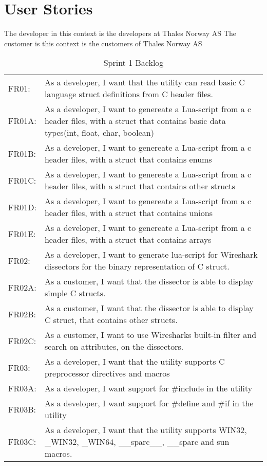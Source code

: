 \section{User Stories}

The developer in this context is the developers at Thales Norway AS \newline
The customer is this context is the customers of Thales Norway AS

\begin{table}[ht] \center
\caption{Sprint 1 Backlog}

\begin{tabular}{l p{12cm} }
FR01: 	&As a developer, I want that the utility can read basic C language struct definitions from C header files.\\
FR01A: 	&As a developer, I want to genereate a Lua-script from a c header files, with a struct that contains basic data types(int, float, char, boolean)\\
FR01B: 	&As a developer, I want to genereate a Lua-script from a c header files, with a struct that contains enums\\
FR01C: 	&As a developer, I want to genereate a Lua-script from a c header files, with a struct that contains other structs\\
FR01D: 	&As a developer, I want to genereate a Lua-script from a c header files, with a struct that contains unions\\
FR01E: 	&As a developer, I want to genereate a Lua-script from a c header files, with a struct that contains arrays\\

FR02:		&As a developer, I want to generate lua-script for Wireshark dissectors for the binary representation of C struct.\\
FR02A: 	&As a customer, I want that the dissector is able to display simple C structs.\\
FR02B: 	&As a customer, I want that the dissector is able to display C struct, that contains other structs.\\
FR02C: 	&As a customer, I want to use Wiresharks built-in filter and search on attributes, on the dissectors.\\

FR03:		&As a developer, I want that the utility supports C preprocessor directives and macros\\
FR03A:	&As a developer, I want support for \#include in the utility\\
FR03B:	&As a developer, I want support for \#define and \#if in the utility\\
FR03C:	&As a developer, I want that the utility supports WIN32, \_WIN32, \_WIN64, \_\_sparc\_\_, \_\_sparc and sun macros.\\


\end{tabular}
\end{table}
